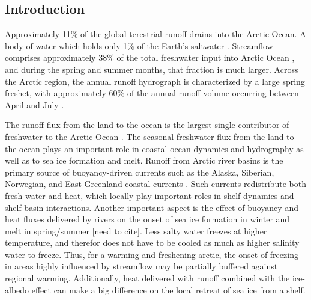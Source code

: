 \documentclass[ms, draft]{agutex}
\begin{document}
%

\begin{article}

%
%

\section{Introduction}

Approximately 11\% of the global terestrial runoff drains into the Arctic Ocean.
A body of water which holds only 1\% of the Earth's saltwater \citep{Lewis_2000,Lammers_2001}.
Streamflow comprises approximately 38\% of the total freshwater input into Arctic Ocean \citep{Serreze_2006}, and during the spring and summer months, that fraction is much larger.
Across the Arctic region, the annual runoff hydrograph is characterized by a large spring freshet, with approximately 60\% of the annual runoff volume occurring between April and July \citep{Lammers_2001}.

The runoff flux from the land to the ocean is the largest single contributor of freshwater to the Arctic Ocean \citep{Serreze_2006}.
The seasonal freshwater flux from the land to the ocean plays an important role in coastal ocean dynamics and hydrography \citep{Rabe_2011,Fichot_2013} as well as to sea ice formation and melt.
Runoff from Arctic river basins is the primary source of buoyancy-driven currents such as the Alaska, Siberian, Norwegian, and East Greenland coastal currents \citep[e.g.][]{Morison_2000,Boyd_2002,McGeehan_2012}.
Such currents redistribute both fresh water and heat, which locally play important roles in shelf dynamics and shelf-basin interactions.
Another important aspect is the effect of buoyancy and heat fluxes delivered by rivers on the onset of sea ice formation in winter and melt in spring/summer [need to cite].
Less salty water freezes at higher temperature, and therefor does not have to be cooled as much as higher salinity water to freeze.
Thus, for a warming and freshening arctic, the onset of freezing in areas highly influenced by streamflow may be partially buffered against regional warming.
Additionally, heat delivered with runoff combined with the ice-albedo effect can make a big difference on the local retreat of sea ice from a shelf.


\end{article}
\end{document}

